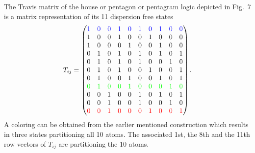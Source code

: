 \documentclass[%
12pt,
prereprint,
showpacs,
showkeys,
preprintnumbers,
amsmath,amssymb,
aps,
pra,
longbibliography,
notitlepage
]{revtex4-1}
\theoremstyle{definition}
\begin{document}
	The Travis matrix of the house or pentagon or pentagram logic depicted in Fig.~7
	is a matrix representation of its 11 dispersion free states~\cite{wright:pent}
	\begin{equation}
		T_{ij}=\begin{pmatrix}
			{\color{blue}1}& {\color{blue}0}& {\color{blue}0}& {\color{blue}1}& {\color{blue}0}& {\color{blue}1}& {\color{blue}0}& {\color{blue}1}& {\color{blue}0}& {\color{blue}0}  \\
			1& 0& 0& 1& 0& 0& 1& 0& 0& 0  \\
			1& 0& 0& 0& 1& 0& 0& 1& 0& 0  \\
			0& 1& 0& 1& 0& 1& 0& 1& 0& 1  \\
			0& 1& 0& 1& 0& 1& 0& 0& 1& 0  \\
			0& 1& 0& 1& 0& 0& 1& 0& 0& 1  \\
			0& 1& 0& 0& 1& 0& 0& 1& 0& 1  \\
			{\color{green}0}& {\color{green}1}& {\color{green}0}& {\color{green}0}& {\color{green}1}& {\color{green}0}& {\color{green}0}& {\color{green}0}& {\color{green}1}& {\color{green}0}  \\
			0& 0& 1& 0& 0& 1& 0& 1& 0& 1  \\
			0& 0& 1& 0& 0& 1& 0& 0& 1& 0  \\
			{\color{red}0}& {\color{red}0}& {\color{red}1}& {\color{red}0}& {\color{red}0}& {\color{red}0}& {\color{red}1}& {\color{red}0}& {\color{red}0}& {\color{red}1}
		\end{pmatrix}
		.
	\end{equation}
	A coloring can be obtained from the earlier mentioned construction
	which results in three states partitioning all 10 atoms.
	The associated 1st, the 8th and the 11th row vectors
	of $T_{ij}$  are partitioning the 10 atoms.
	
\end{document}
